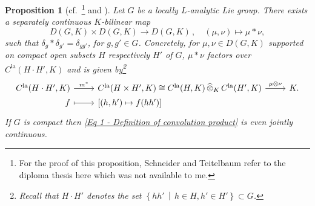 \documentclass[a4paper, reqno, 10pt]{amsart}
\newtheorem{proposition}[theorem]{Proposition}
\theoremstyle{definition}
\numberwithin{equation}{section}
\newcommand{\cotimes}[1]{{\,\widehat{\otimes}_{#1}\,}}
\newcommand{\la}{{\mathrm{la}}}
\newcommand{\lra}{\longrightarrow}
\newcommand{\lto}{\longmapsto}
\newcommand{\mto}{\mapsto}
\let\originalmiddle\middle
\renewcommand{\middle}[1]{\,\originalmiddle#1\,}
\begin{document}
\begin{proposition}[{cf.\ \cite[Prop.\ 2.3]{SchneiderTeitelbaum02LocAnDistApplToGL2}\footnote{For the proof of this proposition, Schneider and Teitelbaum refer to the diploma thesis \cite{FeauxdeLacroix92pAdischDist} here which was not available to me.} and \cite[App.]{SchneiderTeitelbaum05DualAdmLocAnRep}}]\label{Prop 1 - Convolution product}
	Let $G$ be a locally $L$-analytic Lie group.
	There exists a separately continuous $K$-bilinear map
	\begin{equation}\label{Eq 1 - Definition of convolution product}
		D(G,K) \times D(G,K) \lra D(G,K) \,,\quad (\mu, \nu) \lto \mu \ast \nu ,
	\end{equation}
	such that $\delta_g \ast \delta_{g'} = \delta_{gg'}$, for $g, g'\in G$.
	Concretely, for $\mu, \nu \in D(G,K)$ supported on compact open subsets $H$ respectively $H'$ of $G$, $\mu \ast \nu$ factors over $C^\la(H \cdot H', K)$ and is given by\footnote{Recall that $H\cdot H'$ denotes the set $\left\{hh'\middle{|}h\in H, h'\in H'\right\}\subset G$.}
	\begin{equation}\label{Eq 1 - Explicit definition of convolution product}
		\begin{tikzcd}[row sep = 0ex ,	/tikz/column 1/.append style={anchor=base east}	,	/tikz/column 2/.append style={anchor=base west}]
			C^\la(H \cdot H',K) \ar[r, "m^\ast"] & C^\la(H\times H',K) \cong C^\la(H,K) \cotimes{K} C^\la (H',K) \ar[r, "\mu \otimes \nu"] & K . \\
			f \ar[r, mapsto] & \left[ (h,h') \mto f(h h') \right] & 
		\end{tikzcd}
	\end{equation}
	If $G$ is compact then \eqref{Eq 1 - Definition of convolution product} is even jointly continuous.
\end{proposition}
\end{document}
